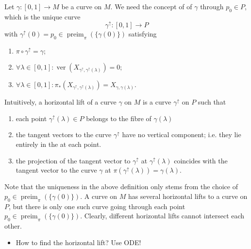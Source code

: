 \documentclass{article}
\begin{document}
\begin{enumerate}
Let $\gamma:[0,1] \rightarrow M$ be a curve on $M$. We need the concept of  of $\gamma$ through $p_{0} \in P$, which is the unique curve
$$
\gamma^{\uparrow}:[0,1] \rightarrow P
$$
with $\gamma^{\uparrow}(0)=p_{0} \in \operatorname{preim}_{\pi}(\{\gamma(0)\})$ satisfying
\begin{enumerate}
    \item $\pi \circ \gamma^{\uparrow}=\gamma$;
    \item $\forall \lambda \in[0,1]: \operatorname{ver}\left(X_{\gamma^{\uparrow}, \gamma^{\uparrow}(\lambda)}\right)=0$;
    \item  $\forall \lambda \in[0,1]: \pi_{*}\left(X_{\gamma^{\uparrow}, \gamma^{\uparrow}(\lambda)}\right)=X_{\gamma, \gamma(\lambda)}$.
\end{enumerate}
Intuitively, a horizontal lift of a curve $\gamma$ on $M$ is a curve $\gamma^{\uparrow}$ on $P$ such that 
\begin{enumerate}
    \item each point $\gamma^{\uparrow}(\lambda) \in P$ belongs to the fibre of $\gamma(\lambda)$
    \item  the tangent vectors to the curve $\gamma^{\uparrow}$ have no vertical component; i.e. they lie entirely in the  at each point.
    \item the projection of the tangent vector to $\gamma^{\uparrow}$ at $\gamma^{\uparrow}(\lambda)$ coincides with the tangent vector to the curve $\gamma$ at $\pi\left(\gamma^{\uparrow}(\lambda)\right)=\gamma(\lambda)$.
\end{enumerate}
Note that the uniqueness in the above definition only stems from the choice of $p_{0} \in \operatorname{preim}_{\pi}(\{\gamma(0)\})$. A curve on $M$ has several horizontal lifts to a curve on $P$, but there is only one such curve going through each point $p_{0} \in \operatorname{preim}_{\pi}(\{\gamma(0)\})$. Clearly, different horizontal lifts cannot intersect each other.

\begin{itemize}
    \item How to find the horizontal lift? Use ODE!
    

\end{itemize}
\end{enumerate}
\end{document}
